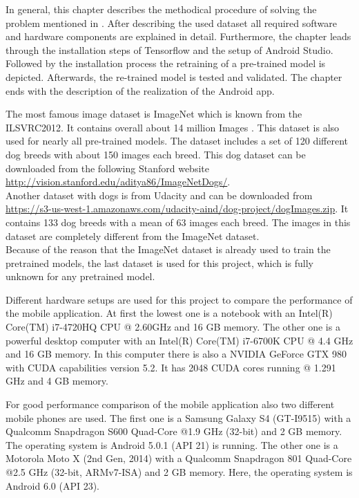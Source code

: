 In general, this chapter describes the methodical procedure of solving the problem mentioned in . After describing the used dataset all required software and hardware components are explained in detail. Furthermore, the chapter leads through the installation steps of Tensorflow and the setup of Android Studio. Followed by the installation process the retraining of a pre-trained model is depicted. Afterwards, the re-trained model is tested and validated. The chapter ends with the description of the realization of the Android app.

The most famous image dataset is ImageNet which is known from the ILSVRC2012. It contains overall about 14 million Images \citep{ImageNet2010}. This dataset is also used for nearly all pre-trained models. The dataset includes a set of 120 different dog breeds with about 150 images each breed. This dog dataset can be downloaded from the following Stanford website \url{http://vision.stanford.edu/aditya86/ImageNetDogs/}. \\
Another dataset with dogs is from Udacity and can be downloaded from \url{https://s3-us-west-1.amazonaws.com/udacity-aind/dog-project/dogImages.zip}. It contains 133 dog breeds with a mean of 63 images each breed. The images in this dataset are completely different from the ImageNet dataset. \\

Because of the reason that the ImageNet dataset is already used to train the pretrained models, the last dataset is used for this project, which is fully unknown for any pretrained model.

Different hardware setups are used for this project to compare the performance of the mobile application.
At first the lowest one is a notebook with an Intel(R) Core(TM) i7-4720HQ CPU @ 2.60GHz and 16 GB memory.
The other one is a powerful desktop computer with an Intel(R) Core(TM) i7-6700K CPU @ 4.4 GHz and 16 GB memory.
In this computer there is also a NVIDIA GeForce GTX 980 with CUDA capabilities version 5.2. It has 2048 CUDA cores running @ 1.291 GHz and 4 GB memory.

For good performance comparison of the mobile application also two different mobile phones are used. The first one is a Samsung Galaxy S4 (GT-I9515) with a Qualcomm Snapdragon S600 Quad-Core @1.9 GHz (32-bit) and 2 GB memory. The operating system is Android 5.0.1 (API 21) is running.
The other one is a Motorola Moto X (2nd Gen, 2014) with a Qualcomm Snapdragon 801 Quad-Core @2.5 GHz (32-bit, ARMv7-ISA) and 2 GB memory. Here, the operating system is Android 6.0 (API 23).

